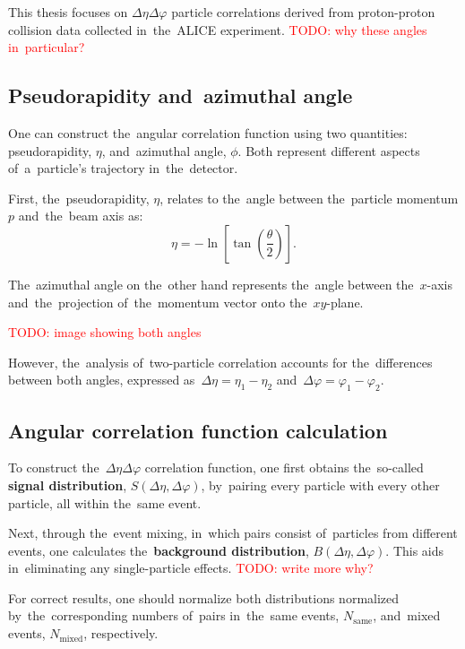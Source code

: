 \documentclass[11pt,a4paper,twoside]{book}
\numberwithin{equation}{chapter}
\newcommand{\todo}[1]{\textcolor{red}{TODO: #1}}
\begin{document}
This thesis focuses on $\Delta\eta\Delta\varphi$ particle correlations derived from proton-proton collision data collected in the ALICE experiment. \todo{why these angles in particular?}

\subsection{Pseudorapidity and azimuthal angle}

One can construct the angular correlation function using two quantities: pseudorapidity, $\eta$, and azimuthal angle, $\phi$. Both represent different aspects of a particle's trajectory in the detector.

First, the pseudorapidity, $\eta$, relates to the angle between the particle momentum $p$ and the beam axis as:
\begin{equation}
    \eta = -\ln\left[\tan\left(\frac{\theta}{2}\right)\right].
\end{equation}

The azimuthal angle on the other hand represents the angle between the $x$-axis and the projection of the momentum vector onto the $xy$-plane.

\todo{image showing both angles}

However, the analysis of two-particle correlation accounts for the differences between both angles, expressed as $\Delta\eta = \eta_1 - \eta_2$ and $\Delta\varphi = \varphi_1 - \varphi_2$.

\subsection{Angular correlation function calculation}

To construct the $\Delta\eta\Delta\varphi$ correlation function, one first obtains the so-called \textbf{signal distribution}, $S(\Delta\eta, \Delta\varphi)$, by pairing every particle with every other particle, all within the same event.

Next, through the event mixing, in which pairs consist of particles from different events, one calculates the \textbf{background distribution}, $B(\Delta\eta, \Delta\varphi)$. This aids in eliminating any single-particle effects. \todo{write more why?}

For correct results, one should normalize both distributions normalized by the corresponding numbers of pairs in the same events, $N_{\text{same}}$, and mixed events, $N_{\text{mixed}}$, respectively.
\end{document}
